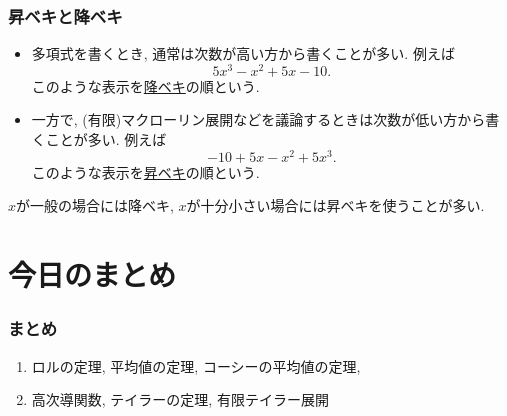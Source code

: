 

\begin{frame}
\frametitle{昇ベキと降ベキ}

\begin{itemize}
\item 多項式を書くとき, 通常は次数が高い方から書くことが多い. 例えば
$$
5x^3-x^2+5x-10. 
$$
このような表示を\underline{降ベキ}の順という. 
\item 一方で, (有限)マクローリン展開などを議論するときは次数が低い方から書くことが多い. 例えば
$$
-10+5x-x^2+5x^3. 
$$
このような表示を\underline{昇ベキ}の順という. 
\end{itemize}

$x$が一般の場合には降ベキ, $x$が十分小さい場合には昇ベキを使うことが多い. 

\end{frame}













\section{今日のまとめ}
\begin{frame}
\frametitle{まとめ}   


\begin{enumerate}
\item ロルの定理, 平均値の定理, コーシーの平均値の定理, 
\item 高次導関数, テイラーの定理, 有限テイラー展開
\end{enumerate} 

\end{frame}